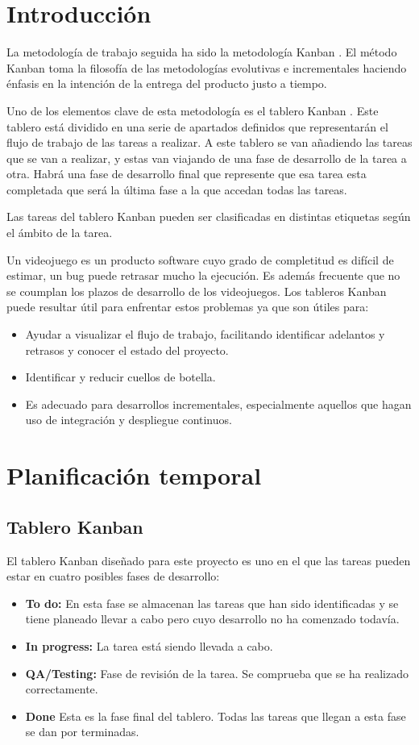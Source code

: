 
\section{Introducción}
La metodología de trabajo seguida ha sido la metodología Kanban \cite{wiki:Kanban}. El método Kanban toma la filosofía de las metodologías evolutivas e incrementales haciendo énfasis en la intención de la entrega del producto justo a tiempo.

Uno de los elementos clave de esta metodología es el tablero Kanban \cite{TableroKanban}. Este tablero está dividido en una serie de apartados definidos que representarán el flujo de trabajo de las tareas a realizar. A este tablero se van añadiendo las tareas que se van a realizar, y estas van viajando de una fase de desarrollo de la tarea a otra. Habrá una fase de desarrollo final que represente que esa tarea esta completada que será la última fase a la que accedan todas las tareas.

Las tareas del tablero Kanban pueden ser clasificadas en distintas etiquetas según el ámbito de la tarea.

Un videojuego es un producto software cuyo grado de completitud es difícil de estimar, un bug puede retrasar mucho la ejecución. Es además frecuente que no se coumplan los plazos de desarrollo de los videojuegos. Los tableros Kanban puede resultar útil para enfrentar estos problemas ya que son útiles para:
\begin{itemize}
\item
Ayudar a visualizar el flujo de trabajo, facilitando identificar adelantos y retrasos y conocer el estado del proyecto.
\item
Identificar y reducir cuellos de botella.
\item
Es adecuado para desarrollos incrementales, especialmente aquellos que hagan uso de integración y despliegue continuos.
\end{itemize}

\section{Planificación temporal}
\subsection{Tablero Kanban}
El tablero Kanban diseñado para este proyecto es uno en el que las tareas pueden estar en cuatro posibles fases de desarrollo:
\begin{itemize}
\item
\textbf{To do:} En esta fase se almacenan las tareas que han sido identificadas y se tiene planeado llevar a cabo pero cuyo desarrollo no ha comenzado todavía.
\item
\textbf{In progress:} La tarea está siendo llevada a cabo.
\item
\textbf{QA/Testing:} Fase de revisión de la tarea. Se comprueba que se ha realizado correctamente.
\item
\textbf{Done} Esta es la fase final del tablero. Todas las tareas que llegan a esta fase se dan por terminadas.
\end{itemize} 

